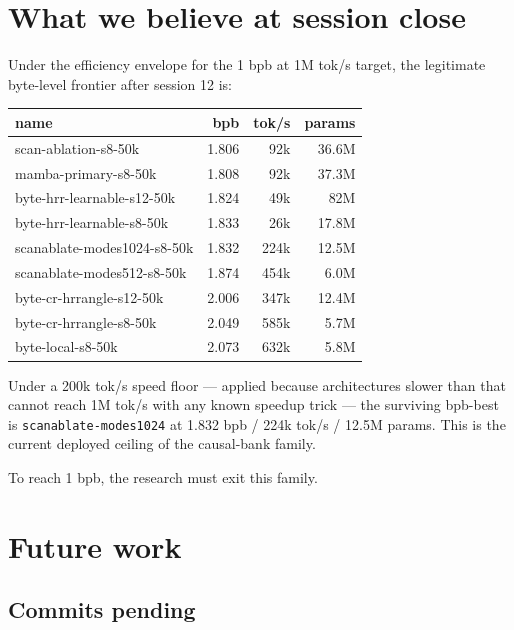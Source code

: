 \section{What we believe at session close}

Under the efficiency envelope for the 1 bpb at 1M tok/s target, the legitimate byte-level frontier after session 12 is:

\begin{center}
\begin{tabular}{lrrr}
\toprule
name & bpb & tok/s & params \\
\midrule
scan-ablation-s8-50k & 1.806 & 92k   & 36.6M \\
mamba-primary-s8-50k & 1.808 & 92k   & 37.3M \\
byte-hrr-learnable-s12-50k & 1.824 & 49k & 82M \\
byte-hrr-learnable-s8-50k & 1.833 & 26k & 17.8M \\
scanablate-modes1024-s8-50k & 1.832 & 224k & 12.5M \\
scanablate-modes512-s8-50k & 1.874 & 454k & 6.0M \\
byte-cr-hrrangle-s12-50k & 2.006 & 347k & 12.4M \\
byte-cr-hrrangle-s8-50k & 2.049 & 585k & 5.7M \\
byte-local-s8-50k & 2.073 & 632k & 5.8M \\
\bottomrule
\end{tabular}
\end{center}

Under a 200k tok/s speed floor --- applied because architectures slower than that cannot reach 1M tok/s with any known speedup trick --- the surviving bpb-best is \texttt{scanablate-modes1024} at 1.832 bpb / 224k tok/s / 12.5M params. This is the current deployed ceiling of the causal-bank family.

To reach 1 bpb, the research must exit this family.

\section{Future work}

\subsection{Commits pending}

